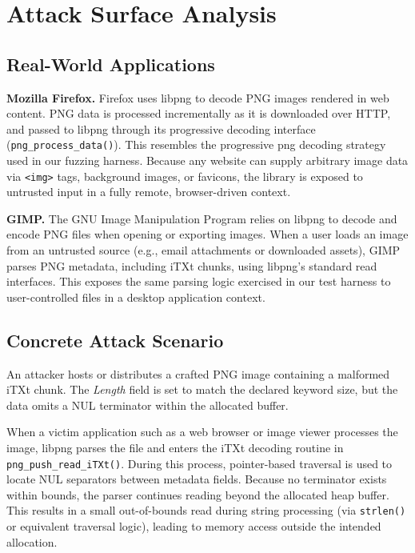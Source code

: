 \section{Attack Surface Analysis}


\subsection{Real-World Applications}

\textbf{Mozilla Firefox.} Firefox uses libpng to decode PNG images
rendered in web content. PNG data is processed incrementally as it is
downloaded over HTTP, and passed to libpng through its progressive
decoding interface (\texttt{png\_process\_data()}). This resembles the
progressive png decoding strategy used in our fuzzing harness. Because any
website can supply arbitrary image data via \texttt{<img>} tags,
background images, or favicons, the library is exposed to untrusted
input in a fully remote, browser-driven context.

\textbf{GIMP.} The GNU Image Manipulation Program relies on libpng
to decode and encode PNG files when opening or exporting images.
When a user loads an image from an untrusted source (e.g., email
attachments or downloaded assets), GIMP parses PNG metadata,
including iTXt chunks, using libpng’s standard read interfaces.
This exposes the same parsing logic exercised in our test harness
to user-controlled files in a desktop application context.

\subsection{Concrete Attack Scenario}

An attacker hosts or distributes a crafted PNG image containing a
malformed iTXt chunk. The \textit{Length} field is set to match the
declared keyword size, but the data omits a NUL terminator within the
allocated buffer.

When a victim application such as a web browser or image viewer
processes the image, libpng parses the file and enters the iTXt
decoding routine in \texttt{png\_push\_read\_iTXt()}. During this
process, pointer-based traversal is used to locate NUL separators
between metadata fields. Because no terminator exists within bounds, the parser continues
reading beyond the allocated heap buffer. This results in a small
out-of-bounds read during string processing (via \texttt{strlen()}
or equivalent traversal logic), leading to memory access outside the
intended allocation.

